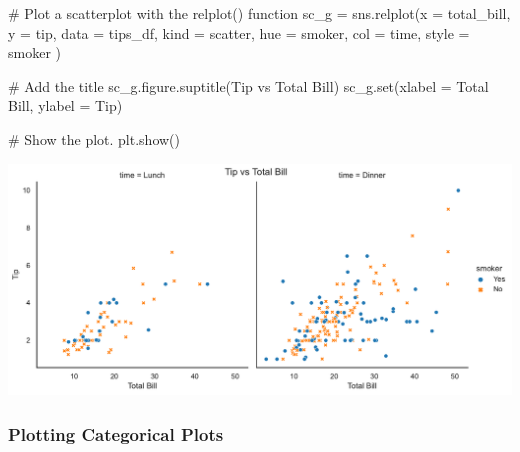 \documentclass[
  letterpaper,
  DIV=11,
  numbers=noendperiod]{scrartcl}
\newenvironment{Shaded}{\begin{snugshade}}{\end{snugshade}}
\newcommand{\BuiltInTok}[1]{\textcolor[rgb]{0.00,0.46,0.62}{#1}}
\newcommand{\CommentTok}[1]{\textcolor[rgb]{0.37,0.37,0.37}{#1}}
\newcommand{\NormalTok}[1]{\textcolor[rgb]{0.00,0.46,0.62}{#1}}
\newcommand{\OperatorTok}[1]{\textcolor[rgb]{0.37,0.37,0.37}{#1}}
\newcommand{\StringTok}[1]{\textcolor[rgb]{0.13,0.47,0.30}{#1}}
\begin{document}
\begin{Shaded}
\begin{Highlighting}[]
\CommentTok{\# Plot a scatterplot with the relplot() function}
\NormalTok{sc\_g }\OperatorTok{=}\NormalTok{ sns.relplot(x }\OperatorTok{=} \StringTok{\textquotesingle{}total\_bill\textquotesingle{}}\NormalTok{, }
\NormalTok{            y }\OperatorTok{=} \StringTok{\textquotesingle{}tip\textquotesingle{}}\NormalTok{,}
\NormalTok{            data }\OperatorTok{=}\NormalTok{ tips\_df,}
\NormalTok{            kind }\OperatorTok{=} \StringTok{\textquotesingle{}scatter\textquotesingle{}}\NormalTok{,}
\NormalTok{            hue }\OperatorTok{=} \StringTok{\textquotesingle{}smoker\textquotesingle{}}\NormalTok{,}
\NormalTok{            col }\OperatorTok{=} \StringTok{\textquotesingle{}time\textquotesingle{}}\NormalTok{,}
\NormalTok{            style }\OperatorTok{=} \StringTok{\textquotesingle{}smoker\textquotesingle{}}
\NormalTok{          )}
 
\CommentTok{\# Add the title}
\NormalTok{sc\_g.figure.suptitle(}\StringTok{\textquotesingle{}Tip vs Total Bill\textquotesingle{}}\NormalTok{)}
\NormalTok{sc\_g.}\BuiltInTok{set}\NormalTok{(xlabel }\OperatorTok{=} \StringTok{\textquotesingle{}Total Bill\textquotesingle{}}\NormalTok{,}
\NormalTok{         ylabel }\OperatorTok{=} \StringTok{\textquotesingle{}Tip\textquotesingle{}}\NormalTok{)}
         
\CommentTok{\# Show the plot.}
\NormalTok{plt.show()}
\end{Highlighting}
\end{Shaded}

\includegraphics{data_visualization_with_seaborn_files/figure-pdf/cell-12-output-1.pdf}

\hypertarget{plotting-categorical-plots}{%
\subsubsection{Plotting Categorical
Plots}\label{plotting-categorical-plots}}
\end{document}
